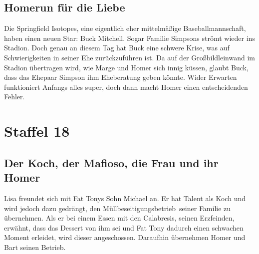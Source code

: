 \subsection{Homerun für die Liebe}\label{HABF16}
Die Springfield Isotopes, eine eigentlich eher mittelmäßige Baseballmannschaft, haben einen neuen Star: Buck Mitchell. Sogar Familie Simpsons strömt wieder ins Stadion. Doch genau an diesem Tag hat Buck eine schwere Krise, was auf Schwierigkeiten in seiner Ehe zurückzuführen ist. Da auf der Großbildleinwand im Stadion übertragen wird, wie Marge und Homer sich innig küssen, glaubt Buck, dass das Ehepaar Simpson ihm Eheberatung geben könnte. Wider Erwarten funktioniert Anfangs alles super, doch dann macht Homer einen entscheidenden Fehler.



\section{Staffel 18}

\subsection{Der Koch, der Mafioso, die Frau und ihr Homer}\label{HABF15}
Lisa freundet sich mit Fat Tonys Sohn Michael an. Er hat Talent als Koch und wird jedoch dazu gedrängt, den \glqq Müll\-be\-sei\-ti\-gungs\-be\-trieb\grqq\ seiner Familie zu über\-neh\-men. Als er bei einem Essen mit den Calabresis, seinen Erzfeinden, erwähnt, dass das Dessert von ihm sei und Fat Tony dadurch einen schwachen Moment erleidet, wird dieser angeschossen. Daraufhin übernehmen Homer und Bart seinen Betrieb.

